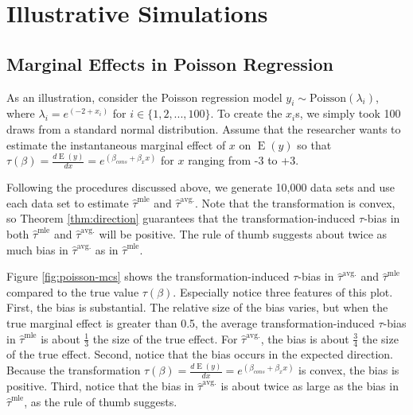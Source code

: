 \documentclass[10pt]{article}
\DeclareMathOperator*{\E}{\text{E}}
\begin{document}
\section*{Illustrative Simulations}

\subsection*{Marginal Effects in Poisson Regression}

As an illustration, consider the Poisson regression model $y_i \sim \text{Poisson}(\lambda_i)$, where $\lambda_i = e^{(-2 + x_i)}$ for $i \in \{1, 2, ..., 100\}$. 
To create the $x_i$s, we simply took 100 draws from a standard normal distribution. 
Assume that the researcher wants to estimate the instantaneous marginal effect of $x$ on $\E(y)$ so that $\tau(\beta) = \frac{d \E (y)}{dx} = e^{(\beta_{cons} + \beta_x x)}$ for $x$ ranging from -3 to +3.

Following the procedures discussed above, we generate 10,000 data sets and use each data set to estimate $\hat{\tau}^\text{mle}$ and $\hat{\tau}^\text{avg.}$. 
Note that the transformation is convex, so Theorem \ref{thm:direction} guarantees that the transformation-induced $\tau$-bias in both $\hat{\tau}^\text{mle}$ and $\hat{\tau}^\text{avg.}$ will be positive. 
The rule of thumb suggests about twice as much bias in $\hat{\tau}^\text{avg.}$ as in $\hat{\tau}^\text{mle}$. 

Figure \ref{fig:poisson-mcs} shows the transformation-induced $\tau$-bias in $\hat{\tau}^\text{avg.}$ and $\hat{\tau}^\text{mle}$ compared to the true value $\tau(\beta)$. 
Especially notice three features of this plot. 
First, the bias is substantial. 
The relative size of the bias varies, but when the true marginal effect is greater than 0.5, the average transformation-induced $\tau$-bias in $\hat{\tau}^\text{mle}$ is about $\frac{1}{3}$ the size of the true effect. 
For $\hat{\tau}^\text{avg.}$, the bias is about $\frac{3}{4}$ the size of the true effect. 
Second, notice that the bias occurs in the expected direction. 
Because the transformation $\tau(\beta) = \frac{d \E (y)}{dx} = e^{(\beta_{cons} + \beta_x x)}$ is convex, the bias is positive. 
Third, notice that the bias in $\hat{\tau}^\text{avg.}$ is about twice as large as the bias in $\hat{\tau}^\text{mle}$, as the rule of thumb suggests.
\end{document}
